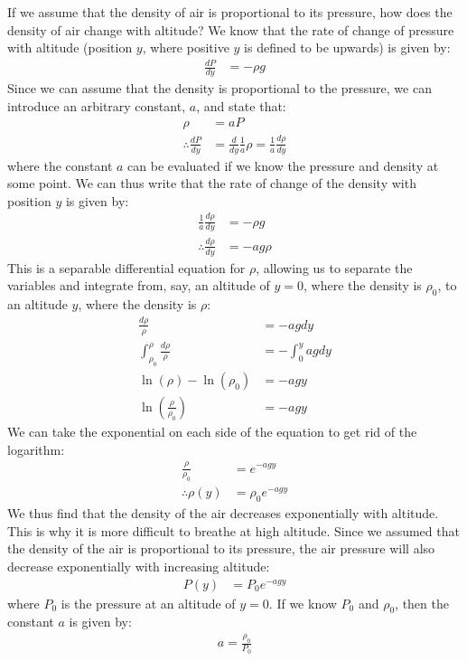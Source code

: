\begin{example}{If we assume that the density of air is proportional to its pressure, how does the density of air change with altitude?}
We know that the rate of change of pressure with altitude (position $y$, where positive $y$ is defined to be upwards) is given by:
\begin{align*}
\frac{dP}{dy} &= -\rho g
\end{align*}
Since we can assume that the density is proportional to the pressure, we can introduce an arbitrary constant, $a$, and state that:
\begin{align*}
\rho &=aP\\
\therefore \frac{dP}{dy} &=  \frac{d}{dy} \frac{1}{a} \rho = \frac{1}{a}  \frac{d\rho}{dy}
\end{align*}
where the constant $a$ can be evaluated if we know the pressure and density at some point. We can thus write that the rate of change of the density with position $y$ is given by:
\begin{align*}
 \frac{1}{a} \frac{d\rho}{dy} &= -\rho g\\
 \therefore \frac{d\rho}{dy} &= -ag \rho
\end{align*}
This is a separable differential equation for $\rho$, allowing us to separate the variables and integrate from, say, an altitude of $y=0$, where the density is $\rho_0$, to an altitude $y$, where the density is $\rho$:
\begin{align*}
\frac{d\rho}{\rho} &= - ag dy\\
\int_{\rho_0}^{\rho}\frac{d\rho}{\rho} &= -\int_{0}^{y}agdy\\
\ln(\rho)-\ln(\rho_0)&= -agy\\
\ln\left( \frac{\rho}{\rho_0} \right)&= -agy
\end{align*}
We can take the exponential on each side of the equation to get rid of the logarithm:
\begin{align*}
\frac{\rho}{\rho_0} &= e^{-agy}\\
\therefore \rho(y) &= \rho_0e^{-agy}
\end{align*}
We thus find that the density of the air decreases exponentially with altitude. This is why it is more difficult to breathe at high altitude. Since we assumed that the density of the air is proportional to its pressure, the air pressure will also decrease exponentially with increasing altitude:
\begin{align*}
P(y) &= P_0e^{-agy}
\end{align*}
where $P_0$ is the pressure at an altitude of $y=0$. If we know $P_0$ and $\rho_0$, then the constant $a$ is given by:
\begin{align*}
a = \frac{\rho_0}{P_0}
\end{align*}


\end{example}

